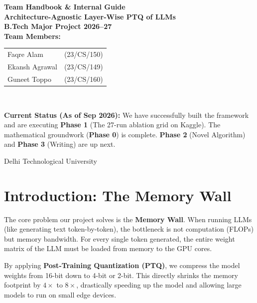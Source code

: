 \documentclass[12pt, a4paper]{article}
\begin{document}
\begin{titlepage}
    \centering
    \vspace*{2cm}
    
    {\Huge \textbf{Team Handbook \& Internal Guide}} \\[1cm]
    {\LARGE \textbf{Architecture-Agnostic Layer-Wise PTQ of LLMs}} \\[0.5cm]
    {\large \textbf{B.Tech Major Project 2026--27}} \\[2cm]
    
    \textbf{Team Members:} \\[0.2cm]
    \begin{tabular}{ll}
        Faqre Alam & (23/CS/150) \\
        Ekansh Agrawal & (23/CS/149) \\
        Guneet Toppo & (23/CS/160)
    \end{tabular} \\[2cm]
    
    \begin{tcolorbox}[colback=blue!5!white,colframe=blue!75!black,title=Project Status Tracker]
        \textbf{Current Status (As of Sep 2026):} We have successfully built the framework and are executing \textbf{Phase 1} (The 27-run ablation grid on Kaggle). The mathematical groundwork (\textbf{Phase 0}) is complete. \textbf{Phase 2} (Novel Algorithm) and \textbf{Phase 3} (Writing) are up next.
    \end{tcolorbox}
    
    \vfill
    {\large Delhi Technological University}
\end{titlepage}

\tableofcontents
\newpage

\section{Introduction: The Memory Wall}
The core problem our project solves is the \textbf{Memory Wall}. When running LLMs (like generating text token-by-token), the bottleneck is not computation (FLOPs) but memory bandwidth. For every single token generated, the entire weight matrix of the LLM must be loaded from memory to the GPU cores. 

By applying \textbf{Post-Training Quantization (PTQ)}, we compress the model weights from 16-bit down to 4-bit or 2-bit. This directly shrinks the memory footprint by $4\times$ to $8\times$, drastically speeding up the model and allowing large models to run on small edge devices.
\end{document}
